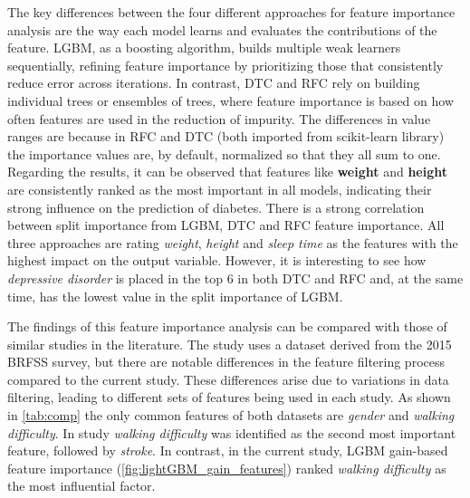 \documentclass[runningheads]{llncs}
\begin{document}
The key differences between the four different approaches for feature importance analysis are the way each model learns and evaluates the contributions of the feature. LGBM, as a boosting algorithm, builds multiple weak learners sequentially, refining feature importance by prioritizing those that consistently reduce error across iterations. In contrast, DTC and RFC rely on building individual trees or ensembles of trees, where feature importance is based on how often features are used in the reduction of impurity. 
The differences in value ranges are because in RFC and DTC (both imported from scikit-learn library) the importance values are, by default, normalized so that they all sum to one.
Regarding the results, it can be observed that features like \textbf{weight} and \textbf{height} are consistently ranked as the most important in all models, indicating their strong influence on the prediction of diabetes.
There is a strong correlation between split importance from LGBM, DTC and RFC feature importance. All three approaches are rating \textit{weight}, \textit{height} and \textit{sleep time} as the features with the highest impact on the output variable. However, it is interesting to see how \textit{depressive disorder} is placed in the top 6 in both DTC and RFC and, at the same time, has the lowest value in the split importance of LGBM.

The findings of this feature importance analysis can be compared with those of similar studies in the literature. 
The study \cite{Xu2024} uses a dataset derived from the 2015 BRFSS survey, but there are notable differences in the feature filtering process compared to the current study. These differences arise due to variations in data filtering, leading to different sets of features being used in each study. As shown in \autoref{tab:comp} the only common features of both datasets are \textit{gender} and \textit{walking difficulty}. In study \cite{Xu2024} \textit{walking difficulty}  was identified as the second most important feature, followed by \textit{stroke}. In contrast, in the current study, LGBM gain-based feature importance (\autoref{fig:lightGBM_gain_features}) ranked \textit{walking difficulty} as the most influential factor. 
\end{document}
